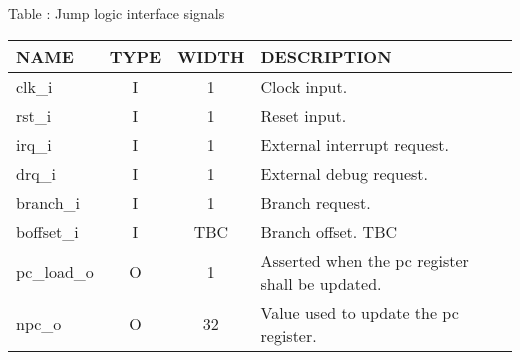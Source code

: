 {
  \vspace{0.5em}
  \begin{center}
    Table \thetable: Jump logic interface signals\label{tab:ifm-interface}
  \end{center}

\footnotesize
\begin{xltabular}{0.9\textwidth}{|l|c|c|X|}
  \hline
  \textbf{NAME} & \textbf{TYPE} & \textbf{WIDTH} & \textbf{DESCRIPTION} \\
  \hline
  clk\_i & I & 1 & Clock input. \\
  \hline
  rst\_i & I & 1 & Reset input. \\
  \hline
  irq\_i & I & 1 & External interrupt request. \\
  \hline
  drq\_i & I & 1 & External debug request. \\
  \hline
  branch\_i & I & 1 & Branch request. \\
  \hline
  boffset\_i & I & TBC & Branch offset. TBC \\
  \hline
  pc\_load\_o & O & 1 & Asserted when the pc register shall be updated. \\
  \hline
  npc\_o & O & 32 & Value used to update the pc register. \\
  \hline
\end{xltabular}
}
